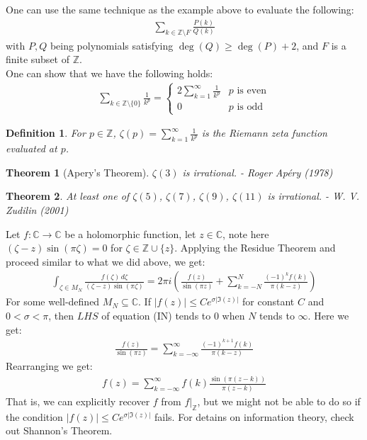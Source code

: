 \documentclass[15pt]{book}
\theoremstyle{break}
\theoremstyle{break}
\newtheorem{thm}{Theorem}[section]
\newtheorem{defn}{Definition}[corL]
\newcommand{\Z}{\mathbb{Z}}
\newcommand{\Complex}{\mathbb{C}}
\begin{document}
\hfill\break\hfill\break
One can use the same technique as the example above to evaluate the following:
\begin{align*}
\sum_{k \in \Z \setminus F} \frac{P(k)}{Q(k)}
\end{align*}
with $P, Q$ being polynomials satisfying $\deg(Q) \geq \deg(P) + 2$, and $F$ is a finite subset of $\Z$. \\

One can show that we have the following holds:
\begin{align*}
\sum_{k \in \Z\setminus\{0\}}\frac{1}{k^p} = \begin{cases}2\sum_{k=1}^\infty \frac{1}{k^p} & p \text{ is even} \\ 0 & p\text{ is odd} \end{cases}
\end{align*}
\begin{defn}
For $p \in \Z$, $\zeta (p) = \sum_{k=1}^\infty \frac{1}{k^p}$ is the Riemann zeta function evaluated at $p$.
\end{defn}
\begin{thm}[Apery's Theorem]
$\zeta(3)$ is irrational. \hfill - Roger Apéry (1978)
\end{thm}
\begin{thm}
At least one of $\zeta(5)$, $\zeta(7)$, $\zeta(9)$, $\zeta(11)$ is irrational.  \hfill - W. V. Zudilin (2001)
\end{thm}
\hfill\break\hfill\break
Let $f:\Complex \to \Complex$ be a holomorphic function, let $z \in \Complex$, note here $(\zeta - z) \sin(\pi \zeta) = 0$ for $\zeta \in \Z\cup\{z\}$. Applying the Residue Theorem and proceed similar to what we did above, we get:
\begin{align*}
\int_{\zeta \in M_N}\frac{f(\zeta)\, d\zeta}{(\zeta - z) \sin(\pi \zeta)} = 2\pi i \left(\frac{f(z)}{\sin(\pi z)}+\sum_{k = -N}^{N} \frac{(-1)^k f(k)}{\pi (k-z)} \right)\tag{IN}
\end{align*}
For some well-defined $M_N \subseteq \Complex$. If $|f(z)|\leq C e^{\sigma |\Im(z)|}$ for constant $C$ and $0 < \sigma < \pi$, then $LHS $ of equation (IN) tends to $0$ when $N$ tends to $\infty$. Here we get:
\begin{align*}
\frac{f(z)}{\sin(\pi z) } = \sum_{k=-\infty}^{\infty}\frac{(-1)^{k+1}f(k)}{\pi (k - z)}
\end{align*} 
Rearranging we get:
\begin{align*}
f(z) = \sum_{k=-\infty}^{\infty} f(k) \frac{\sin(\pi (z-k))}{\pi (z-k)}
\end{align*}
That is, we can explicitly recover $f$ from $f|_{\Z}$, but we might not be able to do so if the condition $|f(z)|\leq C e^{\sigma |\Im(z)|}$ fails. For detains on information theory, check out Shannon's Theorem.
\end{document}
